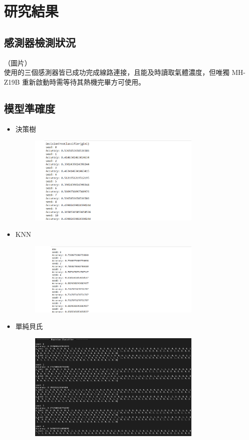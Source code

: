\chapter{研究結果}

\section{感測器檢測狀況}
（圖片）\\
使用的三個感測器皆已成功完成線路連接，且能及時讀取氣體濃度，但唯獨 MH-Z19B 重新啟動時需等待其熱機完畢方可使用。

\section{模型準確度}
\begin{itemize}
	\item 決策樹\\
	\begin{figure}[H]
		\centering
		\includegraphics[width=0.8\textwidth]{pic/decisiontree.png}
	\end{figure}
	\item KNN\\
	\begin{figure}[H]
		\centering
		\includegraphics[width=0.8\textwidth]{pic/knn.png}
	\end{figure}
	\item 單純貝氏\\
	\begin{figure}[H]
		\centering
		\includegraphics[width=0.8\textwidth]{pic/Bayesian.png}

\end{figure}
\end{itemize}
